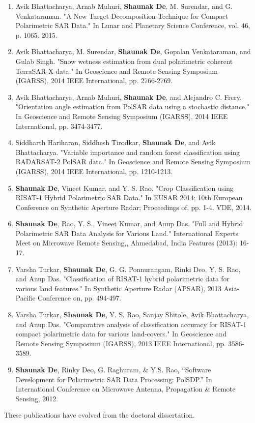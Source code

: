 {\begin{enumerate}
\item Avik Bhattacharya, Arnab Muhuri, \textbf{Shaunak De}, M. Surendar, and G. Venkataraman. "A New Target Decomposition Technique for Compact Polarimetric SAR Data." In Lunar and Planetary Science Conference, vol. 46, p. 1065. 2015.

\item Avik Bhattacharya, M. Surendar, \textbf{Shaunak De}, Gopalan Venkataraman, and Gulab Singh. "Snow wetness estimation from dual polarimetric coherent TerraSAR-X data." In Geoscience and Remote Sensing Symposium (IGARSS), 2014 IEEE International, pp. 2766-2769.

\item Avik Bhattacharya, Arnab Muhuri, \textbf{Shaunak De}, and Alejandro C. Frery. "Orientation angle estimation from PolSAR data using a stochastic distance." In Geoscience and Remote Sensing Symposium (IGARSS), 2014 IEEE International, pp. 3474-3477. 

\item Siddharth Hariharan, Siddhesh Tirodkar, \textbf{Shaunak De}, and Avik Bhattacharya. "Variable importance and random forest classification using RADARSAT-2 PolSAR data." In Geoscience and Remote Sensing Symposium (IGARSS), 2014 IEEE International, pp. 1210-1213. 

\item \textbf{Shaunak De}, Vineet Kumar, and Y. S. Rao. "Crop Classification using RISAT-1 Hybrid Polarimetric SAR Data." In EUSAR 2014; 10th European Conference on Synthetic Aperture Radar; Proceedings of, pp. 1-4. VDE, 2014.

\item \textbf{Shaunak De}, Rao, Y. S., Vineet Kumar, and Anup Das. "Full and Hybrid Polarimetric SAR Data Analysis for Various Land." International Experts Meet on Microwave Remote Sensing,, Ahmedabad, India Features (2013): 16-17.

\item Varsha Turkar, \textbf{Shaunak De}, G. G. Ponnurangam, Rinki Deo, Y. S. Rao, and Anup Das. "Classification of RISAT-1 hybrid polarimetric data for various land features." In Synthetic Aperture Radar (APSAR), 2013 Asia-Pacific Conference on, pp. 494-497. 

\item Varsha Turkar, \textbf{Shaunak De}, Y. S. Rao, Sanjay Shitole, Avik Bhattacharya, and Anup Das. "Comparative analysis of classification accuracy for RISAT-1 compact polarimetric data for various land-covers." In Geoscience and Remote Sensing Symposium (IGARSS), 2013 IEEE International, pp. 3586-3589. 

\item \textbf{Shaunak De}, Rinky Deo, G. Raghuram, \& Y.S. Rao, “Software Development for Polarimetric SAR Data Processing: PolSDP.” In International Conference on Microwave Antenna, Propagation \& Remote Sensing, 2012.


\end{enumerate}
}
\vspace{1cm}
\begin{center}
\quad These publications have evolved from the doctoral dissertation.
\end{center}










